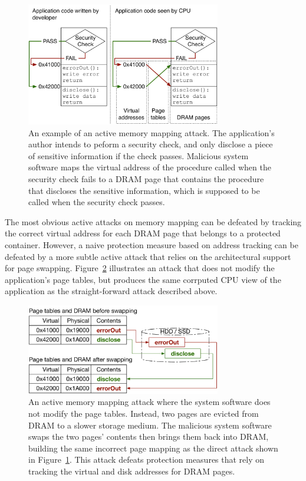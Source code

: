 \begin{figure}[hbt]
  \centering
  \includegraphics[width=85mm]{figures/active_mapping_attack.pdf}
  \caption{
    An example of an active memory mapping attack. The application's author
    intends to peform a security check, and only disclose a piece of sensitive
    information if the check passes. Malicious system software maps the virtual
    address of the procedure called when the security check fails to a DRAM
    page that contains the procedure that discloses the sensitive information,
    which is supposed to be called when the security check passes.
  }
  \label{fig:active_mapping_attack}
\end{figure}

The most obvious active attacks on memory mapping can be defeated by tracking
the correct virtual address for each DRAM page that belongs to a protected
container. However, a naive protection measure based on address tracking can be
defeated by a more subtle active attack that relies on the architectural
support for page swapping. Figure~\ref{fig:swap_mapping_attack} illustrates an
attack that does not modify the application's page tables, but produces the
same corrputed CPU view of the application as the straight-forward attack
described above.

\begin{figure}[hbt]
  \centering
  \includegraphics[width=85mm]{figures/swap_mapping_attack.pdf}
  \caption{
    An active memory mapping attack where the system software does not modify
    the page tables. Instead, two pages are evicted from DRAM to a slower
    storage medium. The malicious system software swaps the two pages' contents
    then brings them back into DRAM, building the same incorrect page mapping
    as the direct attack shown in Figure~\ref{fig:active_mapping_attack}. This
    attack defeats protection measures that rely on tracking the virtual and
    disk addresses for DRAM pages.
  }
  \label{fig:swap_mapping_attack}
\end{figure}

